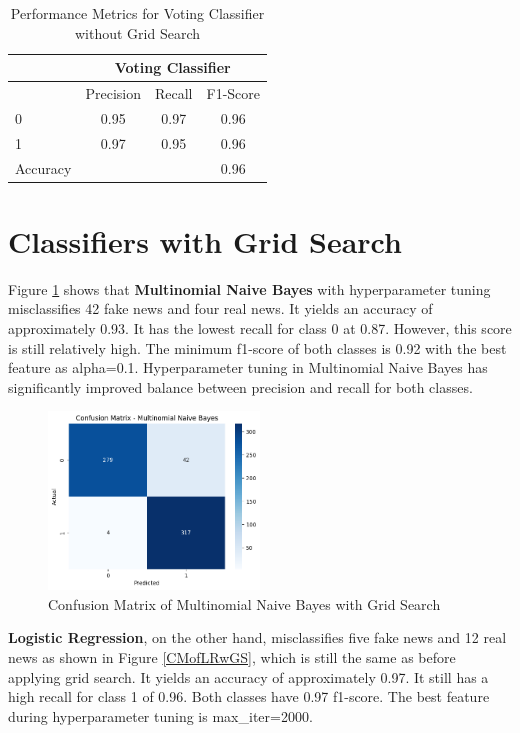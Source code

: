 \begin{table}[ht]
\centering
\begin{tabular}{|l|ccc|}
\hline
& \multicolumn{3}{c|}{Voting Classifier} \\
\hline
& Precision & Recall & F1-Score \\
\hline
0 & 0.95 & 0.97 & 0.96 \\
1 & 0.97 & 0.95 & 0.96 \\
Accuracy & & & 0.96 \\
\hline
\end{tabular}
\caption{Performance Metrics for Voting Classifier without Grid Search}
\label{tab:voting-classifier-metrics}
\end{table}

\clearpage

\section{Classifiers with Grid Search}

Figure \ref{CMofMNBwGS} shows that \textbf{Multinomial Naive Bayes} with hyperparameter tuning misclassifies 42 fake news and four real news. It yields an accuracy of approximately 0.93. It has the lowest recall for class 0 at 0.87. However, this score is still relatively high. The minimum f1-score of both classes is 0.92 with the best feature as alpha=0.1. Hyperparameter tuning in Multinomial Naive Bayes has significantly improved balance between precision and recall for both classes.

\begin{figure}[ht]
\centering
\includegraphics[width=0.5\textwidth,height=0.5\textheight, keepaspectratio]{figures/withgridsearch/NB.png}
  \caption{Confusion Matrix of Multinomial Naive Bayes with Grid Search}
  \label{CMofMNBwGS}
\end{figure}

\clearpage

\textbf{Logistic Regression}, on the other hand, misclassifies five fake news and 12 real news as shown in Figure \ref{CMofLRwGS}, which is still the same as before applying grid search. It yields an accuracy of approximately 0.97. It still has a high recall for class 1 of 0.96. Both classes have 0.97 f1-score. The best feature during hyperparameter tuning is max\_iter=2000.

